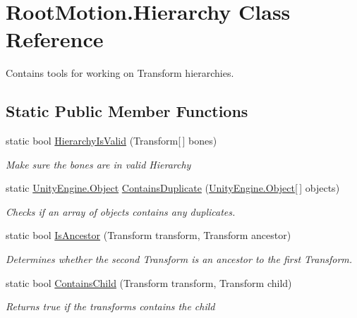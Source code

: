 \hypertarget{class_root_motion_1_1_hierarchy}{}\section{Root\+Motion.\+Hierarchy Class Reference}
\label{class_root_motion_1_1_hierarchy}


Contains tools for working on Transform hierarchies.  


\subsection*{Static Public Member Functions}
\begin{DoxyCompactItemize}
\item 
static bool \mbox{\hyperlink{class_root_motion_1_1_hierarchy_aa3bcbe936d626ff3f02f1f1d9950c845}{Hierarchy\+Is\+Valid}} (Transform\mbox{[}$\,$\mbox{]} bones)
\begin{DoxyCompactList}\small\item\em Make sure the bones are in valid Hierarchy \end{DoxyCompactList}\item 
static \mbox{\hyperlink{_triangles_8cs_aef19bab18b9814edeef255c43e4f6bbc}{Unity\+Engine.\+Object}} \mbox{\hyperlink{class_root_motion_1_1_hierarchy_af2ea02433308f78f5bda023a801332d1}{Contains\+Duplicate}} (\mbox{\hyperlink{_triangles_8cs_aef19bab18b9814edeef255c43e4f6bbc}{Unity\+Engine.\+Object}}\mbox{[}$\,$\mbox{]} objects)
\begin{DoxyCompactList}\small\item\em Checks if an array of objects contains any duplicates. \end{DoxyCompactList}\item 
static bool \mbox{\hyperlink{class_root_motion_1_1_hierarchy_a0b1ef51ffa69b2b47e62ff511dbbe7dc}{Is\+Ancestor}} (Transform transform, Transform ancestor)
\begin{DoxyCompactList}\small\item\em Determines whether the second Transform is an ancestor to the first Transform. \end{DoxyCompactList}\item 
static bool \mbox{\hyperlink{class_root_motion_1_1_hierarchy_aa124a840cb4f6e896fbb280e5aecf80a}{Contains\+Child}} (Transform transform, Transform child)
\begin{DoxyCompactList}\small\item\em Returns true if the transforms contains the child \end{DoxyCompactList}\item 

\end{DoxyCompactItemize}
